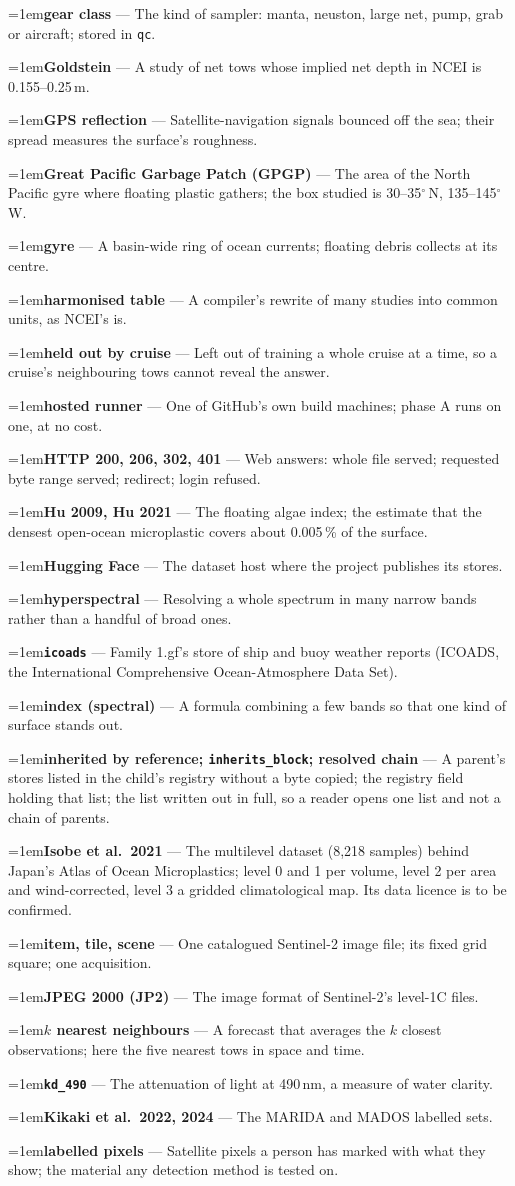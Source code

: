\documentclass[10pt]{article}
\newcommand{\code}[1]{\texttt{#1}}
\newcommand{\gl}[2]{\par\hangindent=1em\hangafter=1\textbf{#1} --- #2\par}
\begin{document}
\gl{gear class}{The kind of sampler: manta, neuston, large net, pump, grab or aircraft; stored in \code{qc}.}
\gl{Goldstein}{A study of net tows whose implied net depth in NCEI is 0.155--0.25\,m.}
\gl{GPS reflection}{Satellite-navigation signals bounced off the sea; their spread measures the surface's roughness.}
\gl{Great Pacific Garbage Patch (GPGP)}{The area of the North Pacific gyre where floating plastic gathers; the box studied is 30--35$^\circ$\,N, 135--145$^\circ$\,W.}
\gl{gyre}{A basin-wide ring of ocean currents; floating debris collects at its centre.}
\gl{harmonised table}{A compiler's rewrite of many studies into common units, as NCEI's is.}
\gl{held out by cruise}{Left out of training a whole cruise at a time, so a cruise's neighbouring tows cannot reveal the answer.}
\gl{hosted runner}{One of GitHub's own build machines; phase A runs on one, at no cost.}
\gl{HTTP 200, 206, 302, 401}{Web answers: whole file served; requested byte range served; redirect; login refused.}
\gl{Hu 2009, Hu 2021}{The floating algae index; the estimate that the densest open-ocean microplastic covers about 0.005\,\% of the surface.}
\gl{Hugging Face}{The dataset host where the project publishes its stores.}
\gl{hyperspectral}{Resolving a whole spectrum in many narrow bands rather than a handful of broad ones.}
\gl{\code{icoads}}{Family 1.gf's store of ship and buoy weather reports (ICOADS, the International Comprehensive Ocean-Atmosphere Data Set).}
\gl{index (spectral)}{A formula combining a few bands so that one kind of surface stands out.}
\gl{inherited by reference; \code{inherits\_block}; resolved chain}{A parent's stores listed in the child's registry without a byte copied; the registry field holding that list; the list written out in full, so a reader opens one list and not a chain of parents.}
\gl{Isobe et al.\ 2021}{The multilevel dataset (8,218 samples) behind Japan's Atlas of Ocean Microplastics; level 0 and 1 per volume, level 2 per area and wind-corrected, level 3 a gridded climatological map. Its data licence is to be confirmed.}
\gl{item, tile, scene}{One catalogued Sentinel-2 image file; its fixed grid square; one acquisition.}
\gl{JPEG 2000 (JP2)}{The image format of Sentinel-2's level-1C files.}
\gl{$k$ nearest neighbours}{A forecast that averages the $k$ closest observations; here the five nearest tows in space and time.}
\gl{\code{kd\_490}}{The attenuation of light at 490\,nm, a measure of water clarity.}
\gl{Kikaki et al.\ 2022, 2024}{The MARIDA and MADOS labelled sets.}
\gl{labelled pixels}{Satellite pixels a person has marked with what they show; the material any detection method is tested on.}
\end{document}
